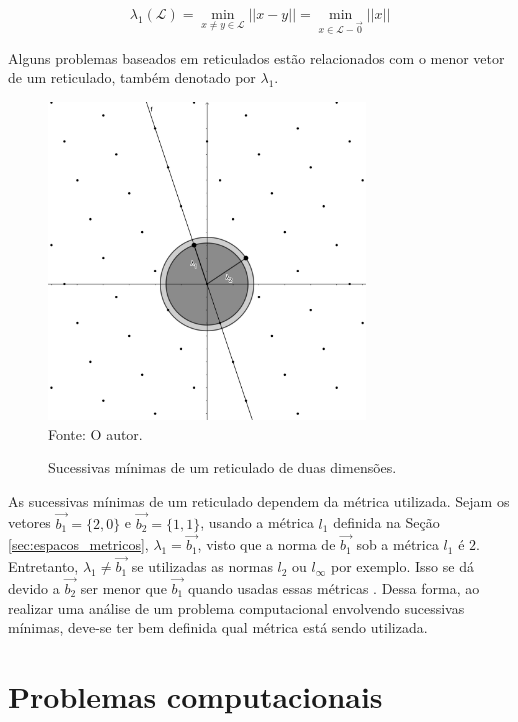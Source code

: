     $$\lambda_1(\mathcal{L}) = \min_{x \neq y \in \mathcal{L}} ||x-y|| = \min_{x \in \mathcal{L} - {\vec{0}}} ||x||$$

    Alguns problemas baseados em reticulados estão relacionados com o menor vetor de um reticulado, também denotado por $\lambda_1$.
  
    \begin{figure}[htb!]
        \centering
        \caption{Sucessivas mínimas de um reticulado de duas dimensões.}
        \includegraphics[width=0.75\textwidth]{Figuras/sucessive_minima.png}\\
        \footnotesize{Fonte: O autor.}
        \label{fig:sucessive_minima}
    \end{figure}
    
    As sucessivas mínimas de um reticulado dependem da métrica utilizada. Sejam os vetores $\vec{b_1} = \{2,0\}$ e $\vec{b_2} = \{1,1\}$, usando a métrica $l_1$ definida na Seção \ref{sec:espacos_metricos}, $\lambda_1 = \vec{b_1}$, visto que a norma de $\vec{b_1}$ sob a métrica $l_1$ é $2$. Entretanto, $\lambda_1 \neq \vec{b_1}$ se utilizadas as normas $l_2$ ou $l_{\infty}$ por exemplo. Isso se dá devido a $\vec{b_2}$ ser menor que $\vec{b_1}$ quando usadas essas métricas \cite{daniele-lattices}. Dessa forma, ao realizar uma análise de um problema computacional envolvendo sucessivas mínimas, deve-se ter bem definida qual métrica está sendo utilizada.

\section{Problemas computacionais}
\label{cap:lattice_problems}

